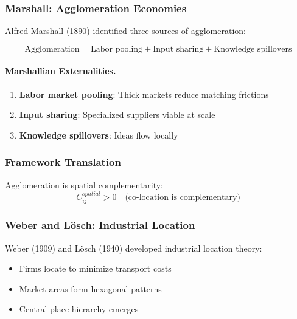 \subsubsection{Marshall: Agglomeration Economies}

Alfred Marshall (1890) identified three sources of agglomeration:

\begin{equation}
\boxed{
\text{Agglomeration} = \text{Labor pooling} + \text{Input sharing} + \text{Knowledge spillovers}
}
\label{eq:marshall-agglomeration}
\end{equation}

\paragraph{Marshallian Externalities.}
\begin{enumerate}
    \item \textbf{Labor market pooling}: Thick markets reduce matching frictions
    \item \textbf{Input sharing}: Specialized suppliers viable at scale
    \item \textbf{Knowledge spillovers}: Ideas flow locally
\end{enumerate}

\subsubsection{Framework Translation}

Agglomeration is spatial complementarity:
\begin{equation}
C_{ij}^{spatial} > 0 \quad \text{(co-location is complementary)}
\end{equation}

\subsubsection{Weber and Lösch: Industrial Location}

Weber (1909) and Lösch (1940) developed industrial location theory:
\begin{itemize}
    \item Firms locate to minimize transport costs
    \item Market areas form hexagonal patterns
    \item Central place hierarchy emerges
\end{itemize}

